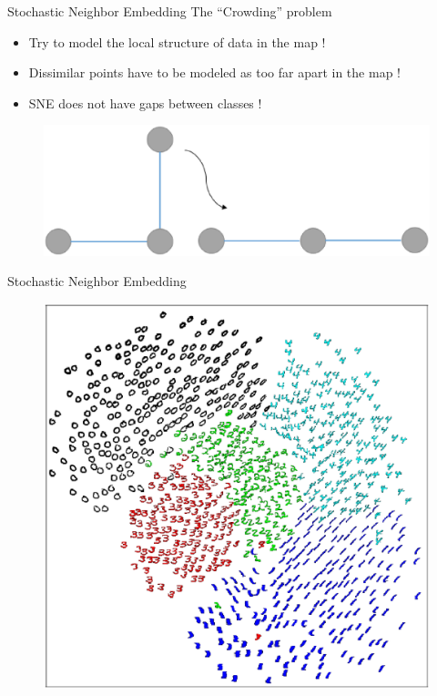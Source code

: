 \documentclass[10pt]{beamer}
\begin{document}
\begin{frame}{Stochastic Neighbor Embedding}
The ``Crowding'' problem
\begin{itemize}
	\item Try to model the local structure of data in the map !
	\item Dissimilar points have to be modeled  as too far apart in the map !
	\item SNE does not have gaps between classes !
\end{itemize}
\begin{figure}
\centering
\includegraphics[scale=0.35]{./image/tsne1.eps}
\end{figure}
\end{frame}

\begin{frame}{Stochastic Neighbor Embedding}
\begin{figure}
\centering
\includegraphics[scale=0.3]{./image/sne.eps}
\end{figure}
\end{frame}
\end{document}
